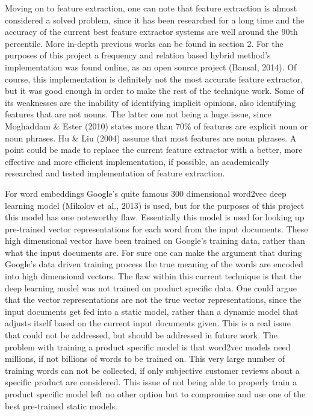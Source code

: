 \documentclass{sig-alternate}
\begin{document}
Moving on to feature extraction, one can note that feature extraction is almost considered a solved problem, since it has been researched for a long time and the accuracy of the current best feature extractor systems are well around the 90th percentile. More in-depth previous works can be found in section 2. For the purposes of this project a frequency and relation based hybrid method's implementation was found online, as an open source project (Bansal, 2014). Of course, this implementation is definitely not the most accurate feature extractor, but it was good enough in order to make the rest of the technique work. Some of its weaknesses are the inability of identifying implicit opinions, also identifying features that are not nouns. The latter one not being a huge issue, since Moghaddam \& Ester (2010) states more than 70\% of features are explicit noun or noun phrases. Hu \& Liu (2004) assume that most features are noun phrases. A point could be made to replace the current feature extractor with a better, more effective and more efficient implementation, if possible, an academically researched and tested implementation of feature extraction.

For word embeddings Google's quite famous 300 dimensional word2vec deep learning model (Mikolov et al., 2013) is used, but for the purposes of this project this model has one noteworthy flaw. Essentially this model is used for looking up pre-trained vector representations for each word from the input documents. These high dimensional vector have been trained on Google's training data, rather than what the input documents are. For sure one can make the argument that during Google's data driven training process the true meaning of the words are encoded into high dimensional vectors. The flaw within this current technique is that the deep learning model was not trained on product specific data. One could argue that the vector representations are not the true vector representations, since the input documents get fed into a static model, rather than a dynamic model that adjusts itself based on the current input documents given. This is a real issue that could not be addressed, but should be addressed in future work. The problem with training a product specific model is that word2vec models need millions, if not billions of words to be trained on. This very large number of training words can not be collected, if only subjective customer reviews about a specific product are considered. This issue of not being able to properly train a product specific model left no other option but to compromise and use one of the best pre-trained static models.
\end{document}
